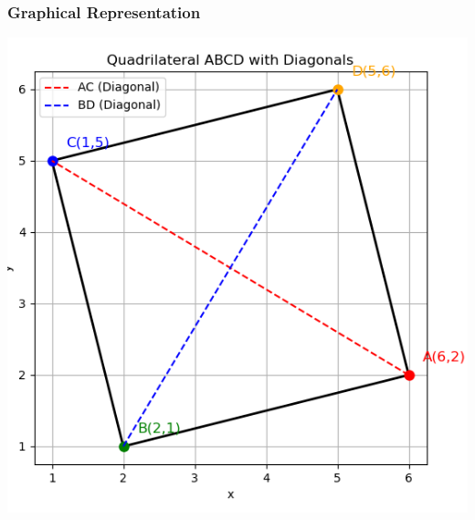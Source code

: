 \documentclass{beamer}
\theoremstyle{remark}
\numberwithin{equation}{section}
\begin{document}
      \begin{frame}
      \frametitle{Graphical Representation}
          \centering
          \includegraphics[width=0.6\linewidth]{figs/fig1.png}
      \end{frame}
\end{document}
